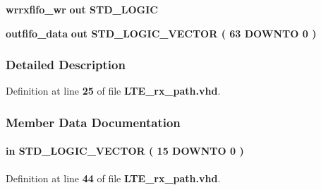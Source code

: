 \begin{DoxyCompactItemize}
\item 
{\bf wrrxfifo\+\_\+wr}  {\bfseries {\bfseries \textcolor{keywordflow}{out}\textcolor{vhdlchar}{ }}} {\bfseries \textcolor{comment}{S\+T\+D\+\_\+\+L\+O\+G\+IC}\textcolor{vhdlchar}{ }} 
\item 
{\bf outfifo\+\_\+data}  {\bfseries {\bfseries \textcolor{keywordflow}{out}\textcolor{vhdlchar}{ }}} {\bfseries \textcolor{comment}{S\+T\+D\+\_\+\+L\+O\+G\+I\+C\+\_\+\+V\+E\+C\+T\+OR}\textcolor{vhdlchar}{ }\textcolor{vhdlchar}{(}\textcolor{vhdlchar}{ }\textcolor{vhdlchar}{ } \textcolor{vhdldigit}{63} \textcolor{vhdlchar}{ }\textcolor{keywordflow}{D\+O\+W\+N\+TO}\textcolor{vhdlchar}{ }\textcolor{vhdlchar}{ } \textcolor{vhdldigit}{0} \textcolor{vhdlchar}{ }\textcolor{vhdlchar}{)}\textcolor{vhdlchar}{ }} 
\end{DoxyCompactItemize}


\subsubsection{Detailed Description}


Definition at line {\bf 25} of file {\bf L\+T\+E\+\_\+rx\+\_\+path.\+vhd}.



\subsubsection{Member Data Documentation}
\paragraph[{ch\+\_\+en}]{ {\bfseries \textcolor{keywordflow}{in}\textcolor{vhdlchar}{ }} {\bfseries \textcolor{comment}{S\+T\+D\+\_\+\+L\+O\+G\+I\+C\+\_\+\+V\+E\+C\+T\+OR}\textcolor{vhdlchar}{ }\textcolor{vhdlchar}{(}\textcolor{vhdlchar}{ }\textcolor{vhdlchar}{ } \textcolor{vhdldigit}{15} \textcolor{vhdlchar}{ }\textcolor{keywordflow}{D\+O\+W\+N\+TO}\textcolor{vhdlchar}{ }\textcolor{vhdlchar}{ } \textcolor{vhdldigit}{0} \textcolor{vhdlchar}{ }\textcolor{vhdlchar}{)}\textcolor{vhdlchar}{ }} \hspace{0.3cm}{\ttfamily [Port]}}\label{classLTE__rx__path_aad35f13bcd8f7e03dd221e6dc514f447}


Definition at line {\bf 44} of file {\bf L\+T\+E\+\_\+rx\+\_\+path.\+vhd}.

